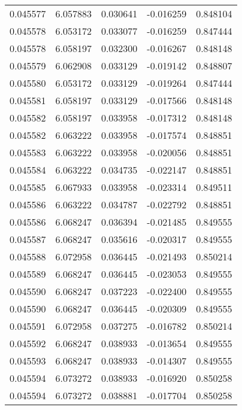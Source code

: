 \begin{tabular}{lrrrr}
0.045577    &  6.057883 &  0.030641 & -0.016259 &             0.848104 \\
0.045578    &  6.053172 &  0.033077 & -0.016259 &             0.847444 \\
0.045578    &  6.058197 &  0.032300 & -0.016267 &             0.848148 \\
0.045579    &  6.062908 &  0.033129 & -0.019142 &             0.848807 \\
0.045580    &  6.053172 &  0.033129 & -0.019264 &             0.847444 \\
0.045581    &  6.058197 &  0.033129 & -0.017566 &             0.848148 \\
0.045582    &  6.058197 &  0.033958 & -0.017312 &             0.848148 \\
0.045582    &  6.063222 &  0.033958 & -0.017574 &             0.848851 \\
0.045583    &  6.063222 &  0.033958 & -0.020056 &             0.848851 \\
0.045584    &  6.063222 &  0.034735 & -0.022147 &             0.848851 \\
0.045585    &  6.067933 &  0.033958 & -0.023314 &             0.849511 \\
0.045586    &  6.063222 &  0.034787 & -0.022792 &             0.848851 \\
0.045586    &  6.068247 &  0.036394 & -0.021485 &             0.849555 \\
0.045587    &  6.068247 &  0.035616 & -0.020317 &             0.849555 \\
0.045588    &  6.072958 &  0.036445 & -0.021493 &             0.850214 \\
0.045589    &  6.068247 &  0.036445 & -0.023053 &             0.849555 \\
0.045590    &  6.068247 &  0.037223 & -0.022400 &             0.849555 \\
0.045590    &  6.068247 &  0.036445 & -0.020309 &             0.849555 \\
0.045591    &  6.072958 &  0.037275 & -0.016782 &             0.850214 \\
0.045592    &  6.068247 &  0.038933 & -0.013654 &             0.849555 \\
0.045593    &  6.068247 &  0.038933 & -0.014307 &             0.849555 \\
0.045594    &  6.073272 &  0.038933 & -0.016920 &             0.850258 \\
0.045594    &  6.073272 &  0.038881 & -0.017704 &             0.850258 \\

\end{tabular}
